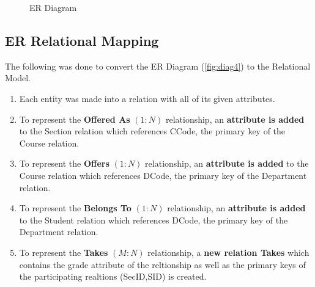 \documentclass[a4paper,11pt]{article}
\begin{document}
\begin{figure}[H]
\caption{ER Diagram}
\label{fig:diag4}
\end{figure}
\subsection{ER Relational Mapping}
The following was done to convert the ER Diagram (\autoref{fig:diag4}) to the Relational Model.
\begin{enumerate}
\item Each entity was made into a relation with all of its given attributes.
\item To represent the \textbf{Offered As} $(1:N)$ relationship, an \textbf{attribute is added} to the Section relation which references CCode, the primary key of the Course relation.
\item To represent the \textbf{Offers} $(1:N)$ relationship, an \textbf{attribute is added} to the Course relation which references DCode, the primary key of the Department relation.
\item To represent the \textbf{Belongs To} $(1:N)$ relationship, an \textbf{attribute is added} to the Student relation which references DCode, the primary key of the Department relation.
\item To represent the \textbf{Takes} $(M:N)$ relationship, a \textbf{new relation Takes} which contains the grade attribute of the reltionship as well as the primary keys of the participating realtions (SecID,SID) is created.
\end{enumerate}
\end{document}
